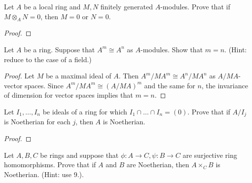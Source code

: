 \documentclass{article}
\begin{document}
 Let $A$ be a local ring and $M,N$ finitely generated $A$-modules. Prove that if $M \otimes_A  N = 0$, then $M = 0$ or $N = 0$.
\begin{proof}


\end{proof}

 Let $A$ be a ring. Suppose that $A^m \cong A^n$ as $A$-modules.  Show that $m = n$. (Hint: reduce to the case of a field.)
\begin{proof}
Let $M$ be a maximal ideal of $A$.  Then $A^m/MA^m \cong A^n/MA^n$ as $A/MA$-vector spaces. Since $A^m/MA^m \cong (A/MA)^m$ and the same for $n$, the invariance of dimension for vector spaces implies that $m = n$.
\end{proof}


 Let $I_1, \ldots, I_n$ be ideals of a ring for which $I_1 \cap \ldots \cap I_n = (0)$. Prove that if $A/I_j$ is Noetherian for each $j$, then $A$ is Noetherian.
\begin{proof}

\end{proof}

 Let $A, B, C$ be rings and suppose that $\phi: A \to C, \psi: B \to C$ are surjective ring homomorphisms. Prove that if $A$ and $B$ are Noetherian, then $A \times_C B$ is Noetherian. (Hint: use 9.).
\end{document}
